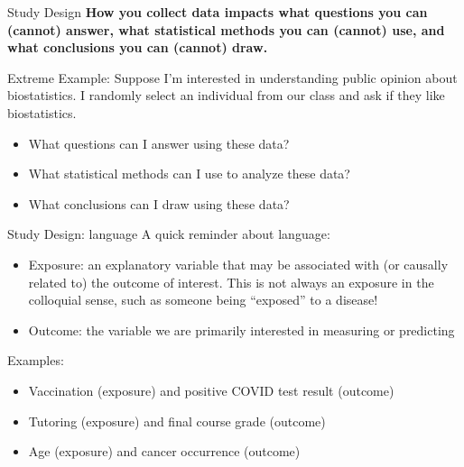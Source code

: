 \documentclass[
  ignorenonframetext,
]{beamer}
\providecommand{\tightlist}{%
  \setlength{\itemsep}{0pt}\setlength{\parskip}{0pt}}
\begin{document}
\begin{frame}{Study Design}
\protect\hypertarget{study-design-1}{}
\textbf{How you collect data impacts what questions you can (cannot)
answer, what statistical methods you can (cannot) use, and what
conclusions you can (cannot) draw.}

{Extreme Example:} Suppose I'm interested in understanding public
opinion about biostatistics. I randomly select an individual from our
class and ask if they like biostatistics.

\begin{itemize}
\tightlist
\item
  What questions can I answer using these data?
\item
  What statistical methods can I use to analyze these data?
\item
  What conclusions can I draw using these data?
\end{itemize}
\end{frame}

\begin{frame}{Study Design: language}
\protect\hypertarget{study-design-language}{}
A quick reminder about language:

\begin{itemize}
\tightlist
\item
  {Exposure}: an explanatory variable that may be associated with (or
  causally related to) the outcome of interest. This is not always an
  exposure in the colloquial sense, such as someone being ``exposed'' to
  a disease!
\item
  {Outcome}: the variable we are primarily interested in measuring or
  predicting
\end{itemize}

Examples:

\begin{itemize}
\tightlist
\item
  Vaccination (exposure) and positive COVID test result (outcome)
\item
  Tutoring (exposure) and final course grade (outcome)
\item
  Age (exposure) and cancer occurrence (outcome)
\end{itemize}
\end{frame}
\end{document}
